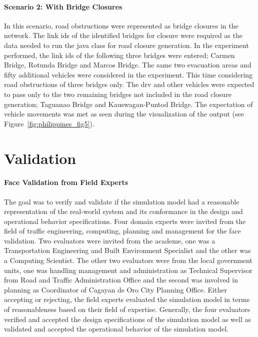 \paragraph{Scenario 2: With Bridge Closures}
In this scenario, road obstructions were represented as bridge closures in the network. The link ids of the identified bridges for closure were required as the data needed to run the java class for road closure generation. In the experiment performed, the link ids of the following three bridges were entered; Carmen Bridge, Rotunda Bridge and Marcos Bridge. The same two evacuation areas and fifty additional vehicles were considered in the experiment. This time considering road obstructions of three bridges only. The \gls{drv} and other vehicles were expected to pass only to the two remaining bridges not included in the road closure generation; Taguanao Bridge and Kauswagan-Puntod Bridge. The expectation of vehicle movements was met as seen during the visualization of the output (see Figure~\ref{fig:philippines_fig5}). 

\section{Validation} 
\paragraph{Face Validation from Field Experts}
The goal was to verify and validate if the simulation model had a reasonable representation of the real-world system and its conformance in the design and operational behavior specifications. Four domain experts were invited from the field of traffic engineering, computing, planning and management for the face validation. Two evaluators were invited from the academe, one was a Transportation Engineering and Built Environment Specialist and the other was a Computing Scientist. The other two evaluators were from the local government units, one was handling management and administration as Technical Supervisor from Road and Traffic Administration Office and the second was involved in planning as Coordinator of Cagayan de Oro City Planning Office. Either accepting or rejecting, the field experts evaluated the simulation model in terms of reasonableness based on their field of expertise. Generally, the four evaluators verified and accepted the design specifications of the simulation model as well as validated and accepted the operational behavior of the simulation model.

